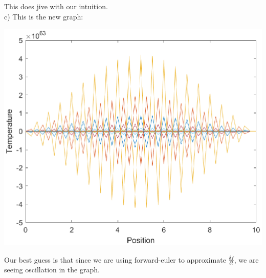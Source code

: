 \documentclass{article}
\begin{document}
This does jive with our intuition.\\
c) This is the new graph:
\begin{center}
    \includegraphics[scale = 0.8]{secondtimestep.eps}
\end{center}
Our best guess is that since we are using forward-euler to approximate $\frac{\delta f}{\delta t}$, we are seeing oscillation in the graph.
\end{document}
